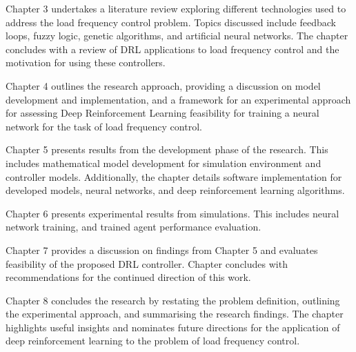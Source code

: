 Chapter 3 undertakes a literature review exploring different technologies used to address the load frequency control problem. Topics discussed include feedback loops, fuzzy logic, genetic algorithms, and artificial neural networks. The chapter concludes with a review of DRL applications to load frequency control and the motivation for using these controllers.

Chapter 4 outlines the research approach, providing a discussion on model development and implementation, and a framework for an experimental approach for assessing Deep Reinforcement Learning feasibility for training a neural network for the task of load frequency control.

Chapter 5 presents results from the development phase of the research. This includes mathematical model development for simulation environment and controller models. Additionally, the chapter details software implementation for developed models, neural networks, and deep reinforcement learning algorithms.

Chapter 6 presents experimental results from simulations. This includes neural network training, and trained agent performance evaluation.

Chapter 7 provides a discussion on findings from Chapter 5 and evaluates feasibility of the proposed DRL controller. Chapter concludes with recommendations for the continued direction of this work.

Chapter 8 concludes the research by restating the problem definition, outlining the experimental approach, and summarising the research findings. The chapter highlights useful insights and nominates future directions for the application of deep reinforcement learning to the problem of load frequency control.